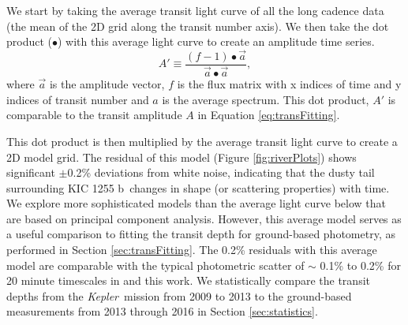 \documentclass[preprint]{aastex61}
\newcommand{\sha}{KIC 1255 b}
\newcommand{\kepler}{{\it Kepler}}
\begin{document}
We start by taking the average transit light curve of all the long cadence data (the mean of the 2D grid along the transit number axis).
We then take the dot product ($\bullet$) with this average light curve to create an amplitude time series.
\begin{equation}
A' \equiv \frac{(f - 1) \bullet \vec{a}}{\vec{a} \bullet \vec{a}},
\end{equation}
where $\vec{a}$ is the amplitude vector, $f$ is the flux matrix with x indices of time and y indices of transit number and $a$ is the average spectrum.
This dot product, $A'$ is comparable to the transit amplitude $A$ in Equation \ref{eq:transFitting}.

This dot product is then multiplied by the average transit light curve to create a 2D model grid.
The residual of this model (Figure \ref{fig:riverPlots}) shows significant $\pm$0.2\% deviations from white noise, indicating that the dusty tail surrounding \sha\ changes in shape (or scattering properties) with time.
We explore more sophisticated models than the average light curve below that are based on principal component analysis.
However, this average model serves as a useful comparison to fitting the transit depth for ground-based photometry, as performed in Section \ref{sec:transFitting}.
The 0.2\% residuals with this average model are comparable with the typical photometric scatter of $\sim$ 0.1\% to 0.2\% for 20 minute timescales in \citet{schlawin2016kic1255} and this work.
We statistically compare the transit depths from the \kepler\ mission from 2009 to 2013 to the ground-based measurements from 2013 through 2016 in Section \ref{sec:statistics}.
\end{document}
